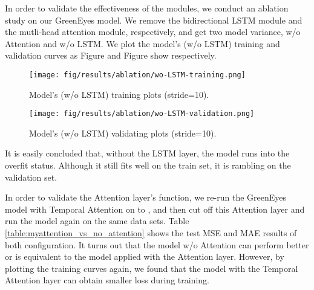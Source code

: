 \documentclass[
twocolumn,
]{ceurart}
\begin{document}
In order to validate the effectiveness of the modules, we conduct an ablation study on our GreenEyes model. We remove the bidirectional LSTM module and the mutli-head attention module, respectively, and get two model variance, w/o Attention and w/o LSTM. We plot the model's (w/o LSTM) training and validation curves as Figure and Figure show respectively.

\begin{figure}[!htbp]
    \centering
    \texttt{[image: fig/results/ablation/wo-LSTM-training.png]}
    \caption{Model's (w/o LSTM) training plots (stride=10).}
    \label{fig:wo-LSTM-training}
\end{figure}

\begin{figure}[!htbp]
    \centering
    \texttt{[image: fig/results/ablation/wo-LSTM-validation.png]}
    \caption{Model's (w/o LSTM) validating plots (stride=10).}
    \label{fig:wo-LSTM-validation}
\end{figure}

It is easily concluded that, without the LSTM layer, the model runs into the overfit status. Although it still fits well on the train set, it is rambling on the validation set.

In order to validate the Attention layer's function, we re-run the GreenEyes model with Temporal Attention on  to , and then cut off this Attention layer and run the model again on the same data sets. Table \ref{table:myattention_vs_no_attention} shows the test MSE and MAE results of both configuration. It turns out that the model w/o Attention can perform better or is equivalent to the model applied with the Attention layer. However, by plotting the training curves again, we found that the model with the Temporal Attention layer can obtain smaller loss during training. 
\end{document}
